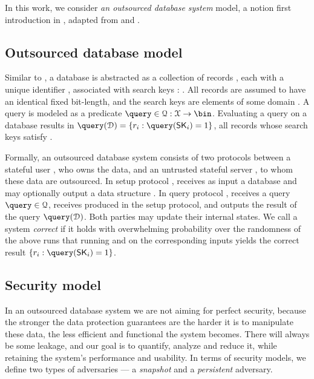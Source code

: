 		In this work, we consider \emph{an outsourced database system} model, a notion first introduction in \cite{outsourced-db-intro}, adapted from \cite{generic-attacks-kellaris} and \cite{epsolute}.

		\subsection{Outsourced database model}\label{section:introduction:model:odb}

			Similar to \cite{epsolute}, a database is abstracted as a collection of \dataSize{} records \record{}, each with a unique identifier \recordID{}, associated with search keys \searchKey{}: \databaseDef{}.
			All records are assumed to have an identical fixed bit-length, and the search keys are elements of some domain \searchKeyDomain{}.
			A query is modeled as a predicate $\query \in \querySet: \searchKeyDomain \to \bin$.
			Evaluating a query \query{} on a database \database{} results in $\query( \database ) = \{ \record_i : \query( \searchKey_i ) = 1 \}$, all records whose search keys satisfy \query{}.

			Formally, an outsourced database system consists of two protocols between a stateful user \user{}, who owns the data, and an untrusted stateful server \server{}, to whom these data are outsourced.
			In setup protocol \protocolSetup{}, \user{} receives as input a database \databaseDef{} and \server{} may optionally output a data structure \serverDS{}.
			In query protocol \protocolQuery{}, \user{} receives a query $\query \in \querySet$, \server{} receives \serverDS{} produced in the setup protocol, and \user{} outputs the result of the query $\query( \database )$.
			Both parties may update their internal states.
			We call a system \emph{correct} if it holds with overwhelming probability over the randomness of the above runs that running \protocolSetup{} and  \protocolQuery{} on the corresponding inputs yields the correct result $\{ \record_i : \query( \searchKey_i ) = 1 \}$.

		\subsection{Security model}

			In an outsourced database system we are not aiming for perfect security, because the stronger the data protection guarantees are the harder it is to manipulate these data, the less efficient and functional the system becomes.
			There will always be some leakage, and our goal is to quantify, analyze and reduce it, while retaining the system's performance and usability.
			In terms of security models, we define two types of adversaries --- a \emph{snapshot} and a \emph{persistent} adversary.

